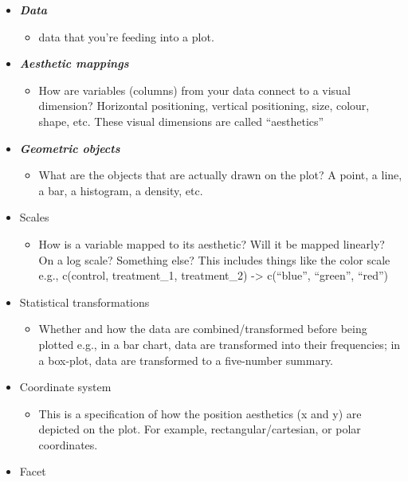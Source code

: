 \documentclass[]{book}
\providecommand{\tightlist}{%
  \setlength{\itemsep}{0pt}\setlength{\parskip}{0pt}}
\begin{document}
\begin{itemize}
\tightlist
\item
  \textbf{\emph{Data}}

  \begin{itemize}
  \tightlist
  \item
    data that you're feeding into a plot.
  \end{itemize}
\item
  \textbf{\emph{Aesthetic mappings}}

  \begin{itemize}
  \tightlist
  \item
    How are variables (columns) from your data connect to a visual
    dimension? Horizontal positioning, vertical positioning, size,
    colour, shape, etc. These visual dimensions are called
    ``aesthetics''
  \end{itemize}
\item
  \textbf{\emph{Geometric objects}}

  \begin{itemize}
  \tightlist
  \item
    What are the objects that are actually drawn on the plot? A point, a
    line, a bar, a histogram, a density, etc.
  \end{itemize}
\item
  Scales

  \begin{itemize}
  \tightlist
  \item
    How is a variable mapped to its aesthetic? Will it be mapped
    linearly? On a log scale? Something else? This includes things like
    the color scale e.g., c(control, treatment\_1, treatment\_2)
    -\textgreater{} c(``blue'', ``green'', ``red'')
  \end{itemize}
\item
  Statistical transformations

  \begin{itemize}
  \tightlist
  \item
    Whether and how the data are combined/transformed before being
    plotted e.g., in a bar chart, data are transformed into their
    frequencies; in a box-plot, data are transformed to a five-number
    summary.
  \end{itemize}
\item
  Coordinate system

  \begin{itemize}
  \tightlist
  \item
    This is a specification of how the position aesthetics (x and y) are
    depicted on the plot. For example, rectangular/cartesian, or polar
    coordinates.
  \end{itemize}
\item
  Facet


\end{itemize}
\end{document}
